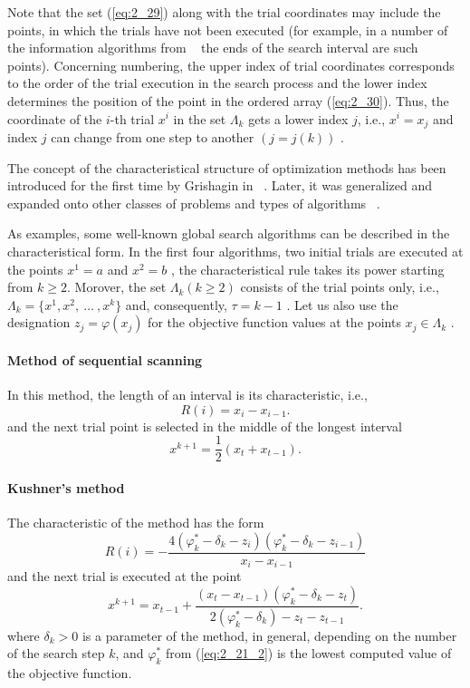 Note that the set (\ref{eq:2_29}) along with the trial coordinates may include the points, in which the trials have not been executed (for example, in a number of the information algorithms from ~\cite{2_StrSergMon2000} the ends of the search interval are such points). Concerning numbering, the upper index of trial coordinates corresponds to the order of the trial execution in the search process and the lower index determines the position of the point in the ordered array (\ref{eq:2_30}). Thus, the coordinate of the $i$-th  trial $x^i$  in the set $\Lambda_k$  gets a lower index  $j$, i.e., $x^i=x_j$  and index $j$ can change from one step to another $(j=j(k))$ .

The concept of the characteristical structure of optimization methods has been introduced for the first time by Grishagin in ~\cite{2_GrishaginCharAlg}. Later, it was generalized and expanded onto other classes of problems and types of algorithms ~\cite{2_GrishaginSergeyevStrongin, 2_Pinter, 2_SergDivBest}. 

As examples, some well-known global search algorithms can be described in the characteristical form. In the first four algorithms, two initial trials are executed at the points $x^1=a$  and $x^2=b$ , the characteristical rule takes its power starting from $k \geq 2$. Morover, the set $\Lambda_k (k\geq2)$    consists of the trial points only, i.e.,  $\Lambda_k=\{x^1,x^2,\:\ldots\:,x^k\}$ and, consequently, $\tau=k-1$ . Let us also use the designation $z_j=\varphi(x_j)$  for the objective function values at the points $x_j\in \Lambda_k$ .
\paragraph{\textbf{Method of sequential scanning}}
In this method, the length of an interval is its characteristic, i.e.,
\begin{equation}
\label{eq:2_33}
R(i)=x_i-x_{i-1}.
\end{equation}
and the next trial point is selected in the middle of the longest interval
\begin{displaymath}
x^{k+1}=\frac{1}{2}(x_t+x_{t-1}).
\end{displaymath}
\paragraph{\textbf{\textbf{Kushner's method \cite{2_Kushner}}}}
The characteristic of the method has the form
\begin{equation}
\label{eq:2_34}
R(i)=-\frac{4(\varphi_k^*-\delta_k-z_i)(\varphi_k^*-\delta_k-z_{i-1})}{x_i-x_{i-1}}
\end{equation}
and the next trial is executed at the point
\begin{equation}
\label{eq:2_35}
x^{k+1}=x_{t-1}+\frac{(x_t-x_{t-1})(\varphi_k^*-\delta_k-z_t)}{2(\varphi_k^*-\delta_k)-z_t-z_{t-1}}.
\end{equation}
where $\delta_k>0$  is a parameter of the method, in general, depending on the number of the search step $k$,  and $\varphi_k^*$ from (\ref{eq:2_21_2}) is the lowest computed value of the objective function.
